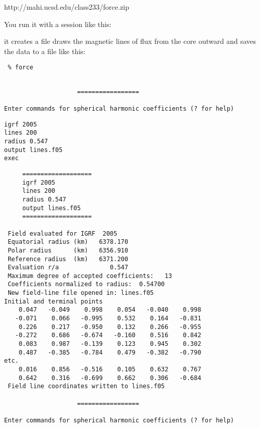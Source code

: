  http://mahi.ucsd.edu/class233/force.zip
 
\noindent  You run it with a session like this:


 it creates a file draws the magnetic lines of flux from the core outward and saves the data to a file like this:
 
 {\singlespacing \color{red}\begin{verbatim}
 % force
 \end{verbatim}}

 {\color{blue}\begin{verbatim} 
 
                    =================
 
Enter commands for spherical harmonic coefficients (? for help)
 \end{verbatim}}

 {\singlespacing \color{red}\begin{verbatim}
igrf 2005
lines 200
radius 0.547
output lines.f05
exec
\end{verbatim}}
 {\singlespacing \color{blue}\begin{verbatim} 
     ===================
     igrf 2005                                                                  
     lines 200                                                                  
     radius 0.547                                                               
     output lines.f05                                                           
     ===================
      
 Field evaluated for IGRF  2005
 Equatorial radius (km)   6378.170
 Polar radius      (km)   6356.910
 Reference radius  (km)   6371.200
 Evaluation r/a              0.547
 Maximum degree of accepted coefficients:   13
 Coefficients normalized to radius:  0.54700
 New field-line file opened in: lines.f05 
Initial and terminal points
    0.047   -0.049    0.998    0.054   -0.040    0.998
   -0.071    0.066   -0.995    0.532    0.164   -0.831
    0.226    0.217   -0.950    0.132    0.266   -0.955
   -0.272    0.686   -0.674   -0.160    0.516    0.842
    0.083    0.987   -0.139    0.123    0.945    0.302
    0.487   -0.385   -0.784    0.479   -0.382   -0.790
etc.
    0.016    0.856   -0.516    0.105    0.632    0.767
    0.642    0.316   -0.699    0.662    0.306   -0.684
 Field line coordinates written to lines.f05                                                               
 
                    =================
 
Enter commands for spherical harmonic coefficients (? for help)
\end{verbatim}}


